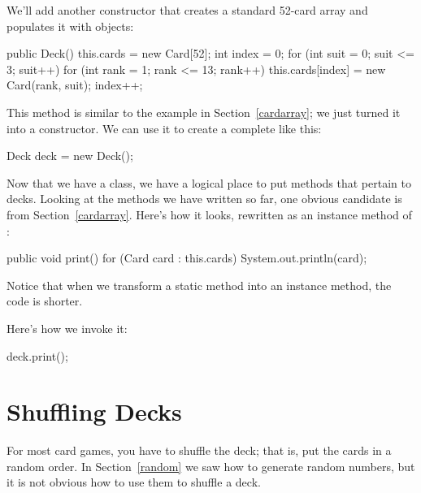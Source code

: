 We'll add another constructor that creates a standard 52-card array and populates it with  objects:

\begin{code}
public Deck() {
    this.cards = new Card[52];
    int index = 0;
    for (int suit = 0; suit <= 3; suit++) {
        for (int rank = 1; rank <= 13; rank++) {
            this.cards[index] = new Card(rank, suit);
            index++;
        }
    }
}
\end{code}

This method is similar to the example in Section~\ref{cardarray}; we just turned it into a constructor.
We can use it to create a complete  like this:

\begin{code}
Deck deck = new Deck();
\end{code}


Now that we have a  class, we have a logical place to put methods that pertain to decks.
Looking at the methods we have written so far, one obvious candidate is  from Section~\ref{cardarray}.
Here's how it looks, rewritten as an instance method of :

\begin{code}
public void print() {
    for (Card card : this.cards) {
        System.out.println(card);
    }
}
\end{code}


Notice that when we transform a static method into an instance method, the code is shorter.

Here's how we invoke it:

\begin{code}
deck.print();
\end{code}


\section{Shuffling Decks}
\label{shuffle}


For most card games, you have to shuffle the deck; that is, put the cards in a random order.
In Section~\ref{random} we saw how to generate random numbers, but it is not obvious how to use them to shuffle a deck.

